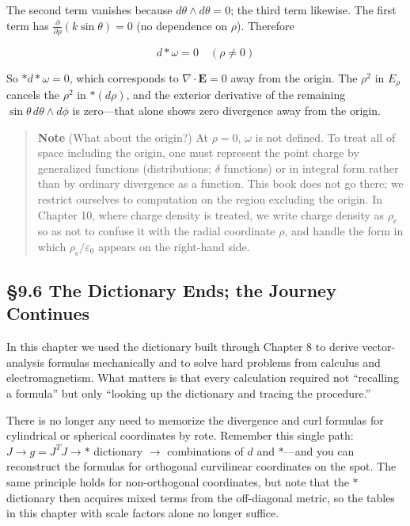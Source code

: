 \documentclass[a4paper,12pt,openany]{book}
\begin{document}
The second term vanishes because \(d\theta\wedge d\theta = 0\); the
third term likewise. The first term has
\(\frac{\partial}{\partial\rho}(k\sin\theta) = 0\) (no dependence on
\(\rho\)). Therefore

\[d\ast\omega = 0 \quad (\rho \neq 0)\]

So \(\ast d\ast\omega = 0\), which corresponds to
\(\nabla\cdot\mathbf{E}=0\) away from the origin. The \(\rho^2\) in
\(E_\rho\) cancels the \(\rho^2\) in \(\ast(d\rho)\), and the exterior
derivative of the remaining \(\sin\theta\,d\theta\wedge d\phi\) is
zero—that alone shows zero divergence away from the origin.

\begin{quote}
\textbf{Note} (What about the origin?) At \(\rho = 0\), \(\omega\) is
not defined. To treat all of space including the origin, one must
represent the point charge by generalized functions (distributions;
\(\delta\) functions) or in integral form rather than by ordinary
divergence as a function. This book does not go there; we restrict
ourselves to computation on the region excluding the origin. In Chapter
10, where charge density is treated, we write charge density as
\(\rho_{\mathrm e}\) so as not to confuse it with the radial coordinate
\(\rho\), and handle the form in which
\(\rho_{\mathrm e}/\varepsilon_0\) appears on the right-hand side.
\end{quote}

\par\vspace{0.35em}\par

\hypertarget{the-dictionary-ends-the-journey-continues}{%
\subsection{§9.6 The Dictionary Ends; the Journey
Continues}\label{the-dictionary-ends-the-journey-continues}}

In this chapter we used the dictionary built through Chapter 8 to derive
vector-analysis formulas mechanically and to solve hard problems from
calculus and electromagnetism. What matters is that every calculation
required not ``recalling a formula'' but only ``looking up the
dictionary and tracing the procedure.''

There is no longer any need to memorize the divergence and curl formulas
for cylindrical or spherical coordinates by rote. Remember this single
path: \(J \to g = J^T J \to \ast\) dictionary \(\to\) combinations of
\(d\) and \(\ast\)—and you can reconstruct the formulas for orthogonal
curvilinear coordinates on the spot. The same principle holds for
non-orthogonal coordinates, but note that the \(\ast\) dictionary then
acquires mixed terms from the off-diagonal metric, so the tables in this
chapter with scale factors alone no longer suffice.
\end{document}

